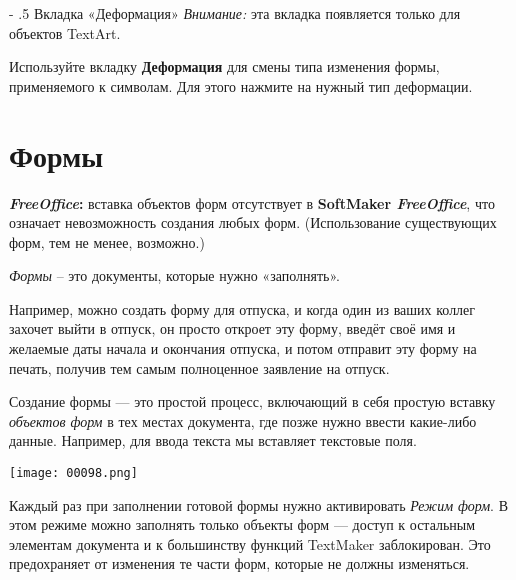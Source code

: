 ﻿\documentclass[a4paper,10pt]{article}
\makeatletter
\renewcommand\paragraph{%
   \@startsection{paragraph}{4}{0mm}%
      {-\baselineskip}%
      {.5\baselineskip}%
      {\normalfont\normalsize\bfseries}}
\makeatother
\begin{document}
\paragraph{Вкладка «Деформация»}
\textit{Внимание:} эта вкладка появляется только для объектов TextArt.

Используйте вкладку \textbf{Деформация} для смены типа изменения формы, применяемого к символам. Для этого нажмите на нужный тип деформации.

\section{Формы} \label{sec:формы}
\begin{mdframed}[backgroundcolor=pink!50]
\textbf{\textit{FreeOffice}:} вставка объектов форм отсутствует в \textbf{SoftMaker \textit{FreeOffice}}, что означает невозможность создания любых форм. (Использование существующих форм, тем не менее, возможно.)
\end{mdframed}

\textit{Формы} -- это документы, которые нужно «заполнять».

Например, можно создать форму для отпуска, и когда один из ваших коллег захочет выйти в отпуск, он просто откроет эту форму, введёт своё имя и желаемые даты начала и окончания отпуска, и потом отправит эту форму на печать, получив тем самым полноценное заявление на отпуск.

Создание формы — это простой процесс, включающий в себя простую вставку \textit{объектов форм} в тех местах документа, где позже нужно ввести какие-либо данные. Например, для ввода текста мы вставляет текстовые поля.

\texttt{[image: 00098.png]}

Каждый раз при заполнении готовой формы нужно активировать \textit{Режим форм}. В этом режиме можно заполнять только объекты форм — доступ к остальным элементам документа и к большинству функций TextMaker заблокирован. Это предохраняет от изменения те части форм, которые не должны изменяться.
\end{document}
